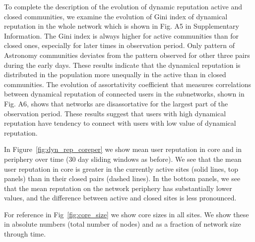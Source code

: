 To complete the description of the evolution of dynamic reputation active and closed communities, we examine the evolution of Gini index of dynamical reputation in the whole network which is shown in Fig. A5 in Supplementary Information. The Gini index is always higher for active communities than for closed ones, especially for later times in observation period. Only pattern of Astronomy communities deviates from the pattern observed for other three pairs during the early days. These results indicate that the dynamical reputation is distributed in the population more unequally in the active than in closed communities. The evolution of assortativity coefficient that measures correlations between dynamical reputation of connected users in the subnetworks, shown in Fig. A6, shows that networks are disassortative for the largest part of the observation period. These results suggest that users with high dynamical reputation have tendency to connect with users with low value of dynamical reputation. 


In Figure~\ref{fig:dyn_rep_coreper} we show mean user reputation in core and in periphery over time (30 day sliding windows as before). We see that the mean user reputation in core is greater in the currently active sites (solid lines, top panels) than in their closed pairs (dashed lines). In the bottom panels, we see that the mean reputation on the network periphery has substantially lower values, and the difference between active and closed sites is less pronounced. 

For reference in Fig~\ref{fig:core_size} we show core sizes in all sites. We show these in absolute numbers (total number of nodes) and as a fraction of network size through time.

